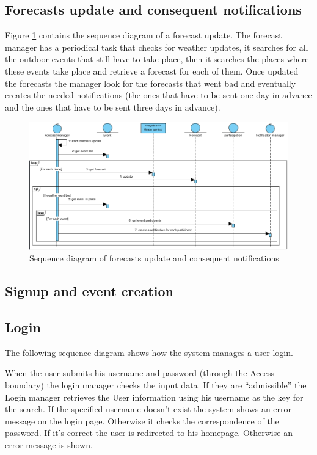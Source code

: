 \documentclass[10pt,a4paper,titlepage]{article}
\begin{document}
\subsection{Forecasts update and consequent notifications}
Figure \ref{fig:sequence_forecasts} contains the sequence diagram of a forecast update. The forecast manager has a periodical task that checks for weather updates, it searches for all the outdoor events that still have to take place, then it searches the places where these events take place and retrieve a forecast for each of them. Once updated the forecasts the manager look for the forecasts that went bad and eventually creates the needed notifications (the ones that have to be sent one day in advance and the ones that have to be sent three days in advance).
\begin{figure}[h]
\centering
\includegraphics[width=\linewidth]{./images/sequence_forecast_update}
\caption[forecast update]{Sequence diagram of forecasts update and consequent notifications}
\label{fig:sequence_forecasts}
\end{figure}

\subsection{Signup and event creation}
\subsection{Login}
The following sequence diagram shows how the system manages a user login.

When the user submits his username and password (through the Access boundary) the login manager checks the input data. If they are “admissible” the Login manager retrieves the User information using his username as the key for the search. If the specified username doesn’t exist the system shows an error message on the login page. Otherwise it checks the correspondence of the password. If it’s correct the user is redirected to his homepage. Otherwise an error message is shown.
\end{document}
